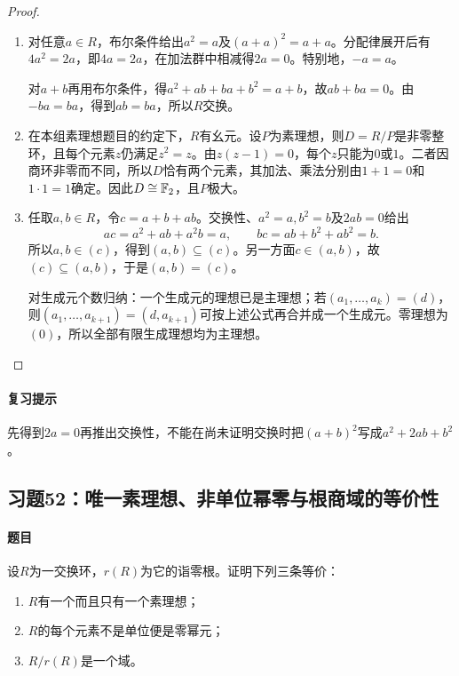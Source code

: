 \begin{proof}

\begin{enumerate}
\item 对任意$a\in R$，布尔条件给出$a^2=a$及$(a+a)^2=a+a$。分配律展开后有$4a^2=2a$，即$4a=2a$，在加法群中相减得$2a=0$。特别地，$-a=a$。

对$a+b$再用布尔条件，得$a^2+ab+ba+b^2=a+b$，故$ab+ba=0$。由$-ba=ba$，得到$ab=ba$，所以$R$交换。
\item 在本组素理想题目的约定下，$R$有幺元。设$P$为素理想，则$D=R/P$是非零整环，且每个元素$z$仍满足$z^2=z$。由$z(z-1)=0$，每个$z$只能为$0$或$1$。二者因商环非零而不同，所以$D$恰有两个元素，其加法、乘法分别由$1+1=0$和$1\cdot1=1$确定。因此$D\cong\mathbb F_2$，且$P$极大。
\item 任取$a,b\in R$，令$c=a+b+ab$。交换性、$a^2=a,b^2=b$及$2ab=0$给出
\[
ac=a^2+ab+a^2b=a,\qquad bc=ab+b^2+ab^2=b.
\]
所以$a,b\in(c)$，得到$(a,b)\subseteq(c)$。另一方面$c\in(a,b)$，故$(c)\subseteq(a,b)$，于是$(a,b)=(c)$。

对生成元个数归纳：一个生成元的理想已是主理想；若$(a_1,\ldots,a_k)=(d)$，则$(a_1,\ldots,a_{k+1})=(d,a_{k+1})$可按上述公式再合并成一个生成元。零理想为$(0)$，所以全部有限生成理想均为主理想。
\end{enumerate}

\end{proof}

\paragraph{复习提示}

先得到$2a=0$再推出交换性，不能在尚未证明交换时把$(a+b)^2$写成$a^2+2ab+b^2$。



\subsection{习题52：唯一素理想、非单位幂零与根商域的等价性}

\label{ex:3:52}

\paragraph{题目}

设$R$为一交换环，$r(R)$为它的诣零根。证明下列三条等价：
\begin{enumerate}[label=(\roman*)]
\item $R$有一个而且只有一个素理想；
\item $R$的每个元素不是单位便是零幂元；
\item $R/r(R)$是一个域。
\end{enumerate}

